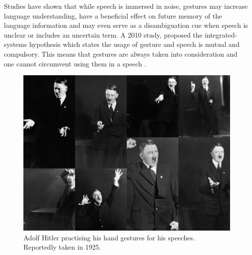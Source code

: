 \documentclass{article}
\begin{document}
Studies have shown that while speech is immersed in noise, gestures may increase language understanding, have a beneficial effect on future memory of the language information and may even serve as a disambiguation cue when speech is unclear or includes an uncertain term. A 2010 study, proposed the integrated-systems hypothesis which states the usage of gesture and speech is mutual and compulsory. This means that gestures are always taken into consideration and one cannot circumvent using them in a speech \cite{OBERMEIER2012857}.

\begin{figure}[H]
	\centering
	\includegraphics[width=0.8\linewidth]{images/adolf-hitler-practising-hand-gestures.jpg}
	\caption{Adolf Hitler practising his hand gestures for his speeches. Reportedly taken in 1925.}
	\label{fig:Adolf Hitler practising his hand gestures. Reportedly taken in 1925.}
\end{figure}
\end{document}
